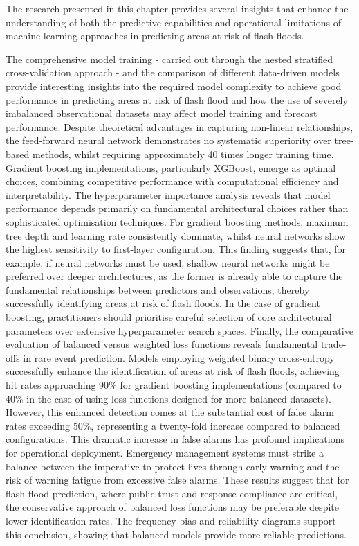 The research presented in this chapter provides several insights that enhance the understanding of both the predictive capabilities and operational limitations of machine learning approaches in predicting areas at risk of flash floods. 

The  comprehensive model training - carried out through the nested stratified cross-validation approach - and the comparison of different data-driven models provide interesting insights into the required model complexity to achieve good performance in predicting areas at risk of flash flood and how the use of severely imbalanced observational datasets may affect model training and forecast performance. Despite theoretical advantages in capturing non-linear relationships, the feed-forward neural network demonstrates no systematic superiority over tree-based methods, whilst requiring approximately 40 times longer training time. Gradient boosting implementations, particularly XGBoost, emerge as optimal choices, combining competitive performance with computational efficiency and interpretability. The hyperparameter importance analysis reveals that model performance depends primarily on fundamental architectural choices rather than sophisticated optimisation techniques. For gradient boosting methods, maximum tree depth and learning rate consistently dominate, whilst neural networks show the highest sensitivity to first-layer configuration. This finding suggests that, for example, if neural networks must be used, shallow neural networks might be preferred over deeper architectures, as the former is already able to capture the fundamental relationships between predictors and observations, thereby successfully identifying areas at risk of flash floods. In the case of gradient boosting, practitioners should prioritise careful selection of core architectural parameters over extensive hyperparameter search spaces. Finally, the comparative evaluation of balanced versus weighted loss functions reveals fundamental trade-offs in rare event prediction. Models employing weighted binary cross-entropy successfully enhance the identification of areas at risk of flash floods, achieving hit rates approaching 90\% for gradient boosting implementations (compared to 40\% in the case of using loss functions designed for more balanced datasets). However, this enhanced detection comes at the substantial cost of false alarm rates exceeding 50\%, representing a twenty-fold increase compared to balanced configurations. This dramatic increase in false alarms has profound implications for operational deployment. Emergency management systems must strike a balance between the imperative to protect lives through early warning and the risk of warning fatigue from excessive false alarms. These results suggest that for flash flood prediction, where public trust and response compliance are critical, the conservative approach of balanced loss functions may be preferable despite lower identification rates. The frequency bias and reliability diagrams support this conclusion, showing that balanced models provide more reliable predictions.


